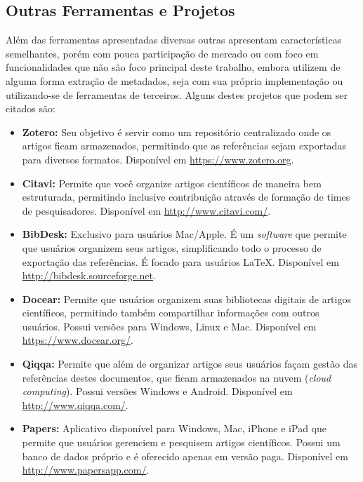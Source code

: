 \subsection{Outras Ferramentas e Projetos}
\label{ssec:other-tools}

Além das ferramentas apresentadas diversas outras apresentam características semelhantes, porém com pouca participação de mercado ou com foco em funcionalidades que não são foco principal deste trabalho, embora utilizem de alguma forma extração de metadados, seja com sua própria implementação ou utilizando-se de ferramentas de terceiros. Alguns destes projetos que podem ser citados são:

\begin{itemize}

    \item \textbf{Zotero:} Seu objetivo é servir como um repositório centralizado onde os artigos ficam armazenados, permitindo que as referências sejam exportadas para diversos formatos. Disponível em \url{https://www.zotero.org}.

    \item \textbf{Citavi:} Permite que você organize artigos científicos de maneira bem estruturada, permitindo inclusive contribuição através de formação de times de pesquisadores. Disponível em \url{http://www.citavi.com/}.

    \item \textbf{BibDesk:} Exclusivo para usuários Mac/Apple. É um \emph{software} que permite que usuários organizem seus artigos, simplificando todo o processo de exportação das referências. É focado para usuários \LaTeX. Disponível em \url{http://bibdesk.sourceforge.net}.

    \item \textbf{Docear:} Permite que usuários organizem suas bibliotecas digitais de artigos científicos, permitindo também compartilhar informações com outros usuários. Possui versões para Windows, Linux e Mac. Disponível em \url{https://www.docear.org/}.

    \item \textbf{Qiqqa:} Permite que além de organizar artigos seus usuários façam gestão das referências destes documentos, que ficam armazenados na nuvem (\emph{cloud computing}). Possui versões Windows e Android. Disponível em \url{http://www.qiqqa.com/}.

    \item \textbf{Papers:} Aplicativo disponível para Windows, Mac, iPhone e iPad que permite que usuários gerenciem e pesquisem artigos científicos. Possui um banco de dados próprio e é oferecido apenas em versão paga. Disponível em \url{http://www.papersapp.com/}.


\end{itemize}
